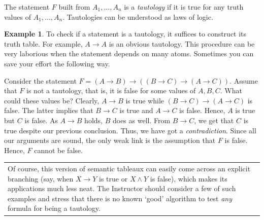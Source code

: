 \documentclass[12pt,notitlepage]{article}
\theoremstyle{plain}
\theoremstyle{definition}
\newtheorem{exm}[thm]{Example}
\theoremstyle{plain}
\newcommand{\1}{\mathbf{1}}
\newcommand{\0}{\mathbf{0}}
\newcommand{\mcomm}[1]{
\medskip\noindent\begin{tabular}{| l}
\parbox{0.99\textwidth}{{\small
#1 }}\end{tabular}
\smallskip}
\begin{document}
The statement $F$ built from $A_1,\ldots, A_n$ is a \emph{tautology} if it is true for any truth values of $A_1,\ldots,A_n$. Tautologies can be understood as laws of logic.
\begin{exm}
To check if a statement is a tautology, it suffices to construct its truth table. For example, $A \to A$ is an obvious tautology. This procedure can be very laborious when the statement depends on many atoms. Sometimes you can save your effort the following way.

Consider the statement $F = (A \to B) \to ((B \to C) \to (A \to C))$. Assume that $F$ is not a tautology, that is, it is false for some values of $A, B, C$. What could these values be? Clearly, $A \to B$ is true while $(B \to C) \to (A \to C)$ is false. The latter implies that $B \to C$ is true and $A \to C$ is false. Hence, $A$ is true but $C$ is false. As $A \to B$ holds, $B$ does as well. From $B \to C$, we get that $C$ is true despite our previous conclusion. Thus, we have got a \emph{contradiction}. Since all our arguments are sound, the only weak link is the assumption that $F$ is false. Hence, $F$ cannot be false.
\end{exm}
\mcomm{Of course, this version of semantic tableaux can easily come across an explicit branching (say, when $X \to Y$ is true or $X \wedge Y$ is false), which makes its applications much less neat. The Instructor should consider a few of such examples and stress that there is no known `good' algorithm to test \emph{any} formula for being a tautology.}
\end{document}
